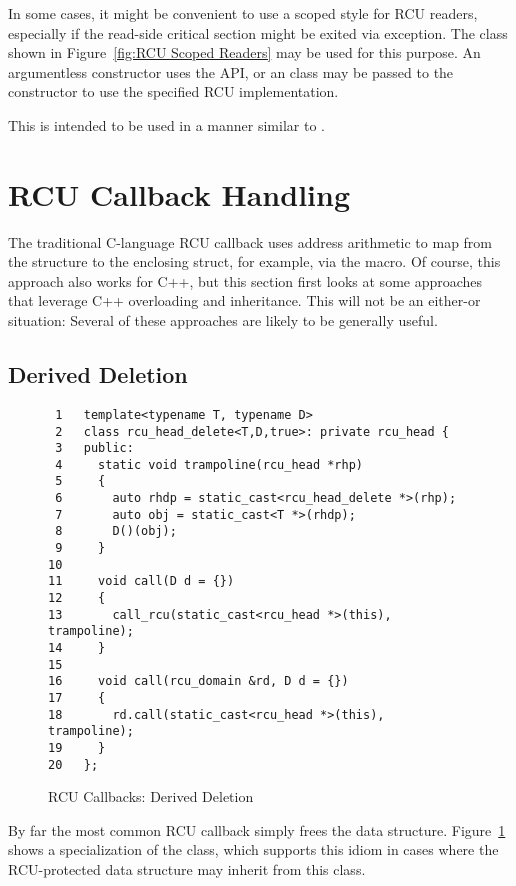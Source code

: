 \documentclass[letterpaper,twocolumn,10pt]{article}
\begin{document}
In some cases, it might be convenient to use a scoped style for RCU readers,
especially if the read-side critical section might be exited via exception.
The  class shown in
Figure~\ref{fig:RCU Scoped Readers}
may be used for this purpose.
An argumentless constructor uses the API, or an  class
may be passed to the constructor to use the specified RCU
implementation.

This is intended to be used in a manner similar to
.

\section{RCU Callback Handling}
\label{sec:RCU Callback Handling}

The traditional C-language RCU callback uses address arithmetic
to map from the  structure to the enclosing struct,
for example, via the  macro.
Of course, this approach also works for C++, but this section first
looks at some approaches that leverage C++ overloading and inheritance.
This will not be an either-or situation: Several of these approaches
are likely to be generally useful.

\subsection{Derived Deletion}
\label{sec:Derived Deletion}

\begin{figure}[tbp]
{ \scriptsize
\begin{verbatim}
 1   template<typename T, typename D>
 2   class rcu_head_delete<T,D,true>: private rcu_head {
 3   public:
 4     static void trampoline(rcu_head *rhp)
 5     {
 6       auto rhdp = static_cast<rcu_head_delete *>(rhp);
 7       auto obj = static_cast<T *>(rhdp);
 8       D()(obj);
 9     }
10
11     void call(D d = {})
12     {
13       call_rcu(static_cast<rcu_head *>(this), trampoline);
14     }
15
16     void call(rcu_domain &rd, D d = {})
17     {
18       rd.call(static_cast<rcu_head *>(this), trampoline);
19     }
20   };
\end{verbatim}
}
\caption{RCU Callbacks: Derived Deletion}
\label{fig:RCU Callbacks: Derived Deletion}
\end{figure}

By far the most common RCU callback simply frees the data structure.
Figure~\ref{fig:RCU Callbacks: Derived Deletion}
shows a specialization of the  class, which supports
this idiom in cases where the RCU-protected data structure may inherit
from this class.
\end{document}
